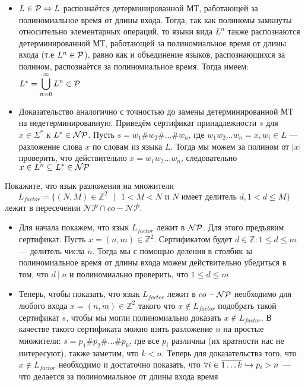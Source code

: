 \documentclass[a4paper,12pt]{article}
\begin{document}
\begin{solution}
	\begin{itemize}
		\item
	$L \in \P \LRa L$ распознаётся детерминированной МТ, работающей за полиномиальное время от длины входа. Тогда, так как полиномы замкнуты относительно элементарных операций, то языки вида $L^n$ также распознаются детерминированной МТ, работающей за полиномиальное время от длины входа (т.е $L^n \in \P$), равно как и объединение языков, распознающихся за полином, распознаётся за полиномиальное время. Тогда имеем: $L^* =\displaystyle\bigcup_{n=0}^{\inf} L^n \in \P$
	
		\item
	Доказательство аналогично с точностью до замены детерминированной МТ на недетерминированную. Приведём сертификат принадлежности $s$ для $x \in \Sigma^*$ к $L^* \in \NP$. Пусть $s = w_1\#w_2\#\ldots\#w_n$, где $w_1w_2\ldots w_n = x, w_i \in L$ --- разложение слова $x$ по словам из языка $L$. Тогда мы можем за полином от $|x|$ проверить, что действительно $x = w_1w_2\ldots w_n$, следовательно $x \in L^n \subseteq L^* \in \NP$
	
	\end{itemize}
\end{solution}

\begin{tasknum}{5}
	Покажите, что язык разложения на множители $$L_{factor} = \{(N,M)\in\mathbb{Z}^2 \mbox{ }|\mbox{ } 1<M<N\mbox{ и } N \mbox{ имеет делитель } d, 1<d\leq M\}$$ лежит в пересечении $\mathcal{NP}\cap co-\mathcal{NP}$. 
\end{tasknum}

\begin{solution}
	\begin{itemize}
		\item Для начала покажем, что язык $L_{factor}$ лежит в $\NP$. Для этого предъявим сертификат. Пусть $x = (n, m) \in \mathbb{Z}^2$. Сертификатом будет $d \in \mathbb{Z}: 1 \le d\le m$ --- делитель числа $n$. Тогда мы с помощью деления в столбик за полиномиальное время от длины входа можем действительно убедиться в том, что $d \ | \ n$ и полиномиально проверить, что $1 \le d \le m$
		
		\item Теперь, чтобы показать, что язык $L_{factor}$ лежит в $co-\NP$ необходимо для любого входа $x = (n, m) \in \mathbb{Z}^2$ такого что  $x \notin L_{factor}$ подобрать такой сертификат $s$, чтобы мы могли полиномиально доказать $x \notin L_{factor}$. В качестве такого сертификата можно взять разложение $n$ на простые множители: $s = p_1\#p_2\#\ldots \#p_k$, где все $p_i$ различны (их кратности нас не интересуют), также заметим, что $k < n$. Теперь для доказательства того, что $x \notin L_{factor}$ необходимо и достаточно показать, что $\forall i \in \ol{1\ldots k} \vyp p_i > n$ --- что делается за полиномиальное от длины входа время
	\end{itemize}
	
\end{solution}
\end{document}
